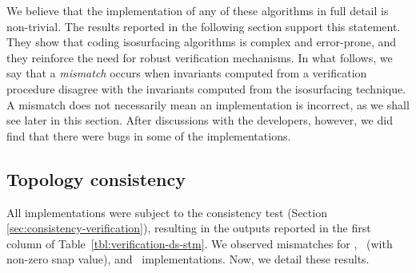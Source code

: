 We believe that the implementation of any of these algorithms in full
detail is non-trivial. The results reported in the following section
support this statement. They show that coding isosurfacing algorithms
is complex and error-prone, and they reinforce the need for robust
verification mechanisms.
In what follows, we say that a \emph{mismatch} occurs when invariants
computed from a verification procedure disagree with the invariants
computed from the isosurfacing technique.  A mismatch does not
necessarily mean an implementation is incorrect, as we shall see later
in this section.  After discussions with the developers, however, we
did find that there were bugs in some of the implementations.

\subsection{Topology consistency}
\label{sec:consistency}

All implementations were subject to the consistency test 
(Section \ref{sec:consistency-verification}), resulting in the outputs
reported in the first column of 
Table~\ref{tbl:verification-ds-stm}. We observed mismatches for
\deliso, \snapmc\ (with non-zero snap value), and \matlab\ 
implementations. Now, we detail these results.

